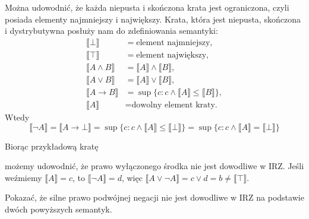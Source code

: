 \documentclass[polish,pretty,bibliography=totocnumbered]{angav}
\begin{document}
Można udowodnić, że każda niepusta i skończona krata jest ograniczona, czyli posiada elementy najmniejszy i największy. Krata, która jest niepusta, skończona i dystrybutywna posłuży nam do zdefiniowania semantyki:
\begin{align*}
    \llbracket \bot \rrbracket &= \text{element najmniejszy}, \\
    \llbracket \top \rrbracket &= \text{element największy}, \\
    \llbracket A \land B \rrbracket &= \llbracket A \rrbracket \land \llbracket B \rrbracket, \\
    \llbracket A \lor B \rrbracket &= \llbracket A \rrbracket \lor \llbracket B \rrbracket, \\
    \llbracket A \to B \rrbracket &= \sup\{c : c \land \llbracket A \rrbracket \leq \llbracket B \rrbracket\}, \\
    \llbracket A \rrbracket &= \text{dowolny element kraty.}
\end{align*}
Wtedy
\[ \llbracket \neg A \rrbracket = \llbracket A \to \bot \rrbracket = \sup\{c : c \land \llbracket A \rrbracket \leq \llbracket \bot \rrbracket\} = \sup\{c : c \land \llbracket A \rrbracket = \llbracket \bot \rrbracket\} \]

Biorąc przykładową kratę
\begin{figure}[H]
    \centering
\end{figure}
możemy udowodnić, że prawo wyłączonego środka nie jest dowodliwe w IRZ. Jeśli weźmiemy $\llbracket A \rrbracket = c$, to $\llbracket \neg A \rrbracket = d$, więc $\llbracket A \lor \neg A \rrbracket = c \lor d = b \neq \llbracket \top \rrbracket$.

\begin{problem}
    Pokazać, że silne prawo podwójnej negacji nie jest dowodliwe w IRZ na podstawie dwóch powyższych semantyk.
\end{problem}
\end{document}
